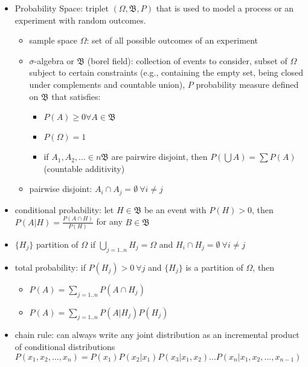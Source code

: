 \documentclass[10pt]{article}
\begin{document}
\begin{itemize}[label=\(\star\), leftmargin=1em, itemsep=-0.3em]
    \item Probability Space: triplet $(\Omega, \mathfrak{B} , P)$ that is used to model a process or an experiment with random outcomes.
          \begin{itemize}[label=\(\star\), leftmargin=1em, itemsep=-0.3em]
              \item sample space $\Omega$: set of all possible outcomes of an experiment
              \item $\sigma$-algebra or $\mathfrak{B}$ (borel field): collection of events to consider, subset of $\Omega$ subject to certain constraints (e.g., containing the empty set, being closed under complements and countable union), $P$ probability measure defined on $\mathfrak{B}$ that satisfies:
                    \begin{itemize}[label=\(\star\), leftmargin=1em, itemsep=0em]
                        \item $P(A) \geq 0 \forall A \in \mathfrak{B}$
                        \item $P(\Omega) = 1$
                        \item if $A_1, A_2, ... \in n \mathfrak{B}$ are pairwire disjoint, then $P(\bigcup A) = \sum P(A)$ (countable additivity)
                    \end{itemize}
              \item pairwise disjoint: $A_i \cap A_j = \emptyset\ \forall i \neq j$
          \end{itemize}
    \item conditional probability: let $H \in \mathfrak{B}$ be an event with $P(H) > 0$, then $P(A|H) = \frac{P(A \cap H)}{P(H)}$ for any $B \in \mathfrak{B}$
    \item $\{H_j\}$ partition of $\Omega$ if $\bigcup_{j=1..n} H_j = \Omega$ and $H_i \cap H_j = \emptyset\ \forall i \neq j$
    \item total probability: if $P(H_j) > 0\ \forall j$ and $\{H_j\}$ is a partition of $\Omega$, then
          \begin{itemize}[label=\(\star\), leftmargin=1em, itemsep=-0.2em]
              \item $P(A)=\sum_{j=1..n} P(A \cap H_j)$
              \item $P(A)=\sum_{j=1..n} P(A|H_j)P(H_j)$
          \end{itemize}
    \item chain rule: can always write any joint distribution as an incremental product of conditional distributions $P(x_1, x_2, ..., x_n) = P(x_1)P(x_2|x_1)P(x_3|x_1, x_2)...P(x_n|x_1, x_2, ..., x_{n-1})$

\end{itemize}
\end{document}
